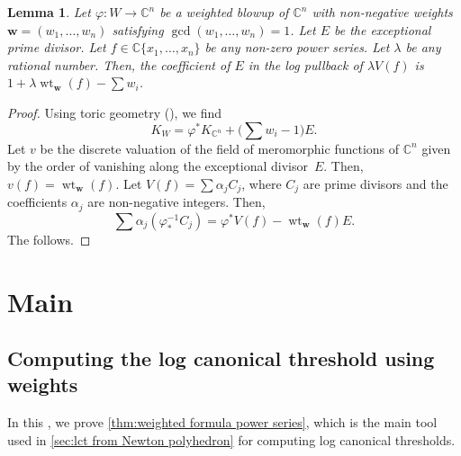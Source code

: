 \documentclass[a4paper, 12pt, oneside]{article}
\theoremstyle{plain}
\newtheorem{lemma}[theorem]{Lemma}
\theoremstyle{definition}
\theoremstyle{remark}
\numberwithin{theorem}{section}
\numberwithin{table}{section}
\numberwithin{equation}{theorem}
\begin{document}
\begin{lemma} \label{thm:discrepancy}
Let $\varphi\colon W \to \mathbb C^n$ be a weighted blowup of $\mathbb C^n$ with non-negative weights $\bm w = (w_1, \ldots, w_n)$ satisfying $\gcd(w_1, \ldots, w_n) = 1$. Let $E$ be the exceptional prime divisor. Let $f \in \mathbb C\{x_1, \ldots, x_n\}$ be any non-zero power series. Let $\lambda$ be any rational number. Then, the coefficient of $E$ in the log pullback of $\lambda V(f)$ is $1 + \lambda \operatorname{wt}_{\bm w}(f) - \sum w_i$.
\end{lemma}

\begin{proof}
Using toric geometry (\cite[Lemma~11.4.10]{CLS11}), we find
\[
K_W = \varphi^* K_{\mathbb C^n} + \bigl(\sum w_i - 1\bigr) E.
\]
Let $v$ be the discrete valuation of the field of meromorphic functions of $\mathbb C^n$ given by the order of vanishing along the exceptional divisor~$E$. Then, $v(f) = \operatorname{wt}_{\bm w}(f)$. Let $V(f) = \sum \alpha_j C_j$, where $C_j$ are prime divisors and the coefficients $\alpha_j$ are non-negative integers. Then,
\[
\sum \alpha_j (\varphi_*^{-1} C_j) = \varphi^* V(f) - \operatorname{wt}_{\bm w}(f) E.
\]
The  follows.
\end{proof}

\section{Main} \label{sec:main}

\subsection{Computing the log canonical threshold using weights} \label{sec:lct from weights}

In this , we prove \cref{thm:weighted formula power series}, which is the main tool used in \cref{sec:lct from Newton polyhedron} for computing log canonical thresholds.
\end{document}
